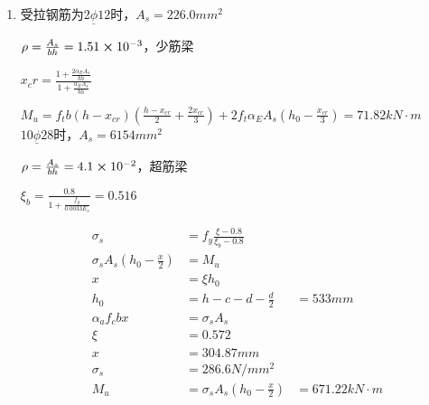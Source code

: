 \documentclass{article}
\begin{document}
\begin{enumerate}
\begin{enumerate}[1.]
              \item 受拉钢筋为2$\underline{\phi}12$时，$A_s=226.0mm^2$
                    \par$\rho=\frac{A_s}{bh}=1.51\cross10^{-3}$，少筋梁
                    \par$x_cr=\frac{1+\frac{2\alpha_EA_s}{bh}}{1+\frac{\alpha_EA_s}{bh}}$
                    \par$M_u=f_tb(h-x_{cr})(\frac{h-x_{cr}}{2}+\frac{2x_{cr}}{3})+2f_t\alpha_EA_s(h_0-\frac{x_{cr}}{3})=71.82kN\cdot m$
                    $10\underline{\phi}28$时，$A_s=6154mm^2$
                    \par$\rho=\frac{A_s}{bh}=4.1\cross10^{-2}$，超筋梁
                    \par$\xi_b=\frac{0.8}{1+\frac{f_y}{0.0033E_s}}=0.516$
                    \par\begin{align*}
                        \sigma_s                     & =f_y\frac{\xi-0.8}{\xi_b-0.8}                    \\
                        \sigma_sA_s(h_0-\frac{x}{2}) & =M_u                                             \\
                        x                            & =\xi h_0                                         \\
                        h_0                          & = h-c-d-\frac{d}{2}           & =533mm           \\
                        \alpha_af_cbx                & =\sigma_sA_s                                     \\
                        \xi                          & =0.572                                           \\
                        x                            & =304.87mm                                        \\
                        \sigma_s                     & =286.6N/mm^2                                     \\
                        M_u                          & =\sigma_sA_s(h_0-\frac{x}{2}) & =671.22kN\cdot m
                    \end{align*}
          \end{enumerate}
\end{enumerate}
\end{document}
